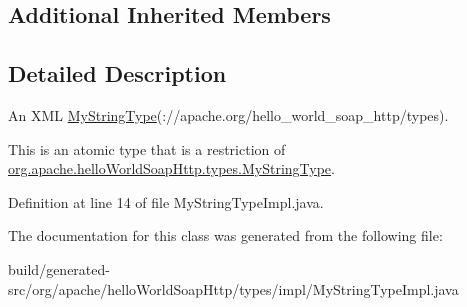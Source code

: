 \subsection*{Additional Inherited Members}


\subsection{Detailed Description}
An X\+M\+L \hyperlink{interfaceorg_1_1apache_1_1hello_world_soap_http_1_1types_1_1_my_string_type}{My\+String\+Type}(\+://apache.org/hello\+\_\+world\+\_\+soap\+\_\+http/types).

This is an atomic type that is a restriction of \hyperlink{interfaceorg_1_1apache_1_1hello_world_soap_http_1_1types_1_1_my_string_type}{org.\+apache.\+hello\+World\+Soap\+Http.\+types.\+My\+String\+Type}. 

Definition at line 14 of file My\+String\+Type\+Impl.\+java.



The documentation for this class was generated from the following file\+:\begin{DoxyCompactItemize}
\item 
build/generated-\/src/org/apache/hello\+World\+Soap\+Http/types/impl/My\+String\+Type\+Impl.\+java\end{DoxyCompactItemize}
